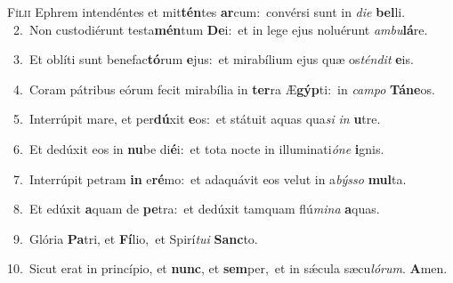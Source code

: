\lettrine{\initial\textcolor{\initialcolor}{F}}{ílii} Ephrem intendéntes et mit\-\textbf{tén}\-tes \textbf{ar}\-cum:~\star convérsi sunt in \textit{di}\-\textit{e} \textbf{bel}\-li.\\
{\numbfont\textcolor{\numbcolor}{~2.}}~Non custodiérunt testa\-\textbf{mén}\-tum \textbf{De}\-i:~\star et in lege ejus noluérunt \textit{am}\-\textit{bu}\textbf{lá}re.\par
{\numbfont\textcolor{\numbcolor}{~3.}}~Et oblíti sunt benefac\-\textbf{tó}\-rum \textbf{e}\-jus:~\star et mirabílium ejus quæ os\-\textit{tén}\-\textit{dit} \textbf{e}\-is.\par
{\numbfont\textcolor{\numbcolor}{~4.}}~Coram pátribus eórum fecit mirabília in \textbf{ter}\-ra Æ\-\textbf{gýp}\-ti:~\star in \textit{cam}\-\textit{po} \textbf{Tá}\-\textbf{ne}os.\par
{\numbfont\textcolor{\numbcolor}{~5.}}~Interrúpit mare, et per\-\textbf{dú}\-xit \textbf{e}\-os:~\star et státuit aquas qua\textit{si} \textit{in} \textbf{u}\-tre.\par
{\numbfont\textcolor{\numbcolor}{~6.}}~Et dedúxit eos in \textbf{nu}\-be di\-\textbf{é}\-i:~\star et tota nocte in illuminati\-\textit{ó}\-\textit{ne} \textbf{i}\-gnis.\par
{\numbfont\textcolor{\numbcolor}{~7.}}~Interrúpit petram \textbf{in} e\-\textbf{ré}\-mo:~\star et adaquávit eos velut in a\-\textit{býs}\-\textit{so} \textbf{mul}\-ta.\par
{\numbfont\textcolor{\numbcolor}{~8.}}~Et edúxit \textbf{a}\-quam de \textbf{pe}\-tra:~\star et dedúxit tamquam flú\-\textit{mi}\-\textit{na} \textbf{a}\-quas.\par
{\numbfont\textcolor{\numbcolor}{~9.}}~Glória \textbf{Pa}\-tri, et \textbf{Fí}\-lio,~\star et Spirí\-\textit{tu}\-\textit{i} \textbf{Sanc}\-to.\par
{\numbfont\textcolor{\numbcolor}{10.}}~Sicut erat in princípio, et \textbf{nunc}\-, et \textbf{sem}\-per,~\star et in sǽcula sæcu\-\textit{ló}\-\textit{rum}. \textbf{A}\-men.\par
